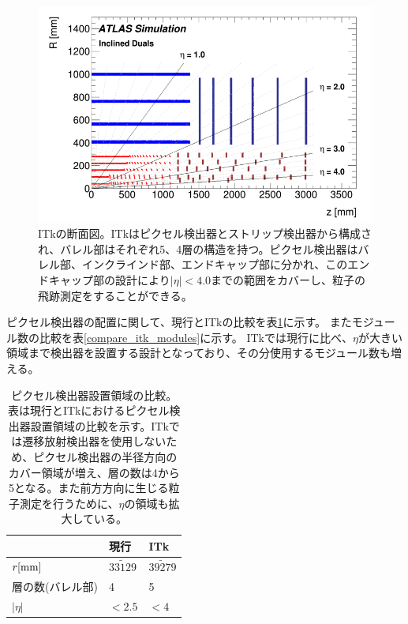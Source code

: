 \begin{figure}[bpt]\centering
\includegraphics[width=12cm]{itk_cross_section}
\caption[ITkの断面図]{ITkの断面図\cite{1-3}。ITkはピクセル検出器とストリップ検出器から構成され、バレル部はそれぞれ5、4層の構造を持つ。ピクセル検出器はバレル部、インクラインド部、エンドキャップ部に分かれ、このエンドキャップ部の設計により$|\eta|<4.0$までの範囲をカバーし、粒子の飛跡測定をすることができる。}
\label{itk_cross_section}
\end{figure}

ピクセル検出器の配置に関して、現行とITkの比較を表\ref{compare_itk_pixel}に示す。
またモジュール数の比較を表\ref{compare_itk_modules}に示す。
ITkでは現行に比べ、$\eta$が大きい領域まで検出器を設置する設計となっており、その分使用するモジュール数も増える。

\begin{table}[tbp]
\begin{center}
\caption[ピクセル検出器設置領域の比較]{ピクセル検出器設置領域の比較。表は現行とITkにおけるピクセル検出器設置領域の比較を示す。ITkでは遷移放射検出器を使用しないため、ピクセル検出器の半径方向のカバー領域が増え、層の数は4から5となる。また前方方向に生じる粒子測定を行うために、$\eta$の領域も拡大している。}
\label{compare_itk_pixel}
  \begin{tabular}{|lll|} \hline
    & 現行 & ITk \\ \hline
    $r[\rm{mm}]$ & $33\tilde129$ & $39\tilde279$ \\ 
    層の数(バレル部) & 4 & 5 \\ 
    $|\eta|$ & $<2.5$ & $<4$ \\ \hline
  \end{tabular}
\end{center}
\end{table}

